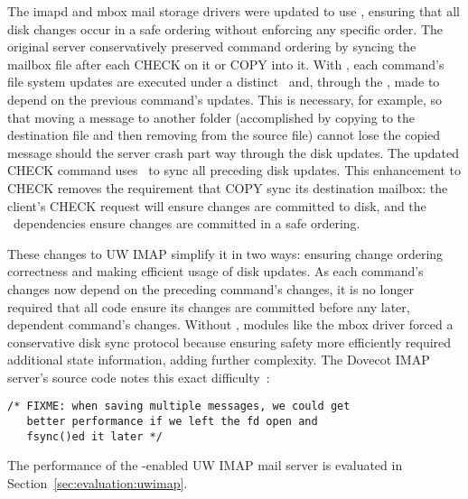 The imapd and mbox mail storage
drivers were updated to use \patchgroups, ensuring that all disk changes occur in a safe
ordering without enforcing any specific order.
%
The original server conservatively preserved command ordering by
syncing the mailbox file after each CHECK on it or COPY into it. With
\patchgroups, each command's file system updates are executed under a
distinct \patchgroup\ and, through the \patchgroup, made to depend on the
previous command's updates. This is necessary, for example, so that
moving a message to another folder (accomplished by copying to the
destination file and then removing from the source file) cannot lose
the copied message should the server crash part way through the disk
updates.
%
The updated CHECK command uses \pgSync\ to sync all preceding disk
updates. This enhancement to CHECK removes the requirement that COPY
sync its destination mailbox: the client's CHECK request will ensure
changes are committed to disk, and the \patchgroup\ dependencies ensure
changes are committed in a safe ordering.

These changes to UW IMAP simplify it in two ways:
%
ensuring change ordering correctness
%
and making efficient usage of disk updates.
%
As each command's changes now depend on the preceding command's
changes, it is no longer required that all code
ensure its changes are committed before any later, dependent
command's changes. Without \patchgroups, modules like the mbox driver
forced a conservative disk sync protocol because ensuring safety more
efficiently required additional state information, adding further
complexity. The Dovecot IMAP server's source code notes this exact
difficulty~\cite[maildir-save.c]{dovecot}:

\vspace{-0.5\baselineskip}
\begin{scriptsize}
\begin{verbatim}
/* FIXME: when saving multiple messages, we could get
   better performance if we left the fd open and
   fsync()ed it later */
\end{verbatim}
\end{scriptsize}
\vspace{-0.5\baselineskip}

The performance of the \patchgroup{}-enabled UW IMAP mail server is
evaluated in Section~\ref{sec:evaluation:uwimap}.
